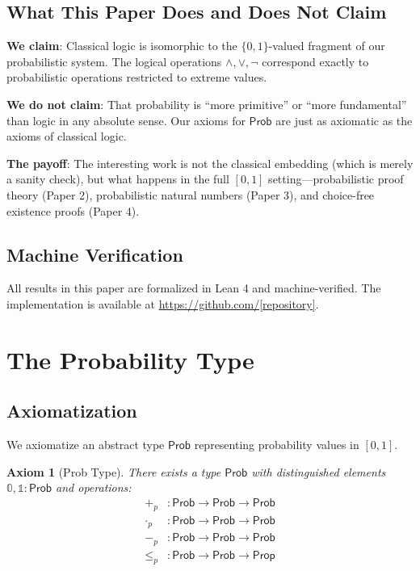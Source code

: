 \documentclass[11pt,a4paper]{article}
\newtheorem{axiom}{Axiom}
\newcommand{\Prob}{\mathsf{Prob}}
\newcommand{\pzero}{\mathbb{0}}
\newcommand{\pone}{\mathbb{1}}
\newcommand{\ple}{\leq_p}
\newcommand{\padd}{+_p}
\newcommand{\pmul}{\cdot_p}
\newcommand{\psub}{-_p}
\begin{document}
\subsection{What This Paper Does and Does Not Claim}

\textbf{We claim}: Classical logic is isomorphic to the $\{0,1\}$-valued fragment of our probabilistic system. The logical operations $\land, \lor, \neg$ correspond exactly to probabilistic operations restricted to extreme values.

\textbf{We do not claim}: That probability is ``more primitive'' or ``more fundamental'' than logic in any absolute sense. Our axioms for $\Prob$ are just as axiomatic as the axioms of classical logic.

\textbf{The payoff}: The interesting work is not the classical embedding (which is merely a sanity check), but what happens in the full $[0,1]$ setting---probabilistic proof theory (Paper 2), probabilistic natural numbers (Paper 3), and choice-free existence proofs (Paper 4).

\subsection{Machine Verification}

All results in this paper are formalized in Lean 4 and machine-verified. The implementation is available at \url{https://github.com/[repository]}.

\section{The Probability Type}

\subsection{Axiomatization}

We axiomatize an abstract type $\Prob$ representing probability values in $[0,1]$.

\begin{axiom}[Prob Type]
There exists a type $\Prob$ with distinguished elements $\pzero, \pone : \Prob$ and operations:
\begin{align*}
    \padd &: \Prob \to \Prob \to \Prob \\
    \pmul &: \Prob \to \Prob \to \Prob \\
    \psub &: \Prob \to \Prob \to \Prob \\
    \ple &: \Prob \to \Prob \to \mathsf{Prop}
\end{align*}
\end{axiom}
\end{document}
